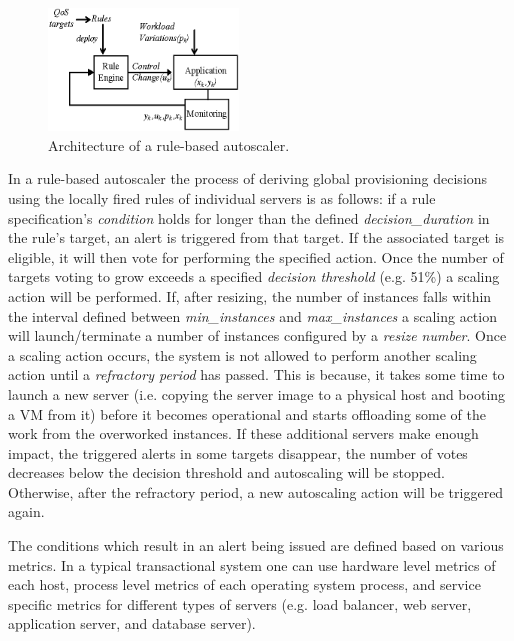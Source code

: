 \begin{figure}[b]
	\centering
	\includegraphics[width=0.45\textwidth]{image/loop/controller-rule-based.eps} 	
	\caption{Architecture of a rule-based autoscaler.}
	\label{fig:rule-based-resource-provisioner}
\end{figure}

In a rule-based autoscaler the process of deriving global provisioning decisions using the locally fired rules of individual servers is as follows:
if a rule specification's \textit{condition} holds for longer than the defined \textit{decision\_duration} in the rule's target, an alert is triggered from that target. 
If the associated target is eligible, it will then vote for performing the specified action. 
Once the number of targets voting to grow exceeds a specified \textit{decision threshold} (e.g. 51\%) a scaling action will be performed. 
If, after resizing, the number of instances falls within the interval defined between \textit{min\_instances} and \textit{max\_instances} a scaling action will launch/terminate a number of instances configured by a \textit{resize number}. Once a scaling action occurs, the system is not allowed to perform another scaling action until a \textit{refractory period} has passed. This is because, it takes some time to launch a new server (i.e. copying the server image to a physical host and booting a VM from it) 
before it becomes operational and starts offloading some of the work from the overworked instances. 
If these additional servers make enough impact, the triggered alerts in some targets disappear, the number of votes decreases below the decision threshold and autoscaling will be stopped. Otherwise, after the refractory period, a new autoscaling action will be triggered again. 

The conditions which result in an alert being issued are defined based on various metrics. 
In a typical transactional system one can use hardware level metrics of each host, process level metrics of each operating system process, 
and service specific metrics for different types of servers (e.g. load balancer, web server, application server, and database server). 

